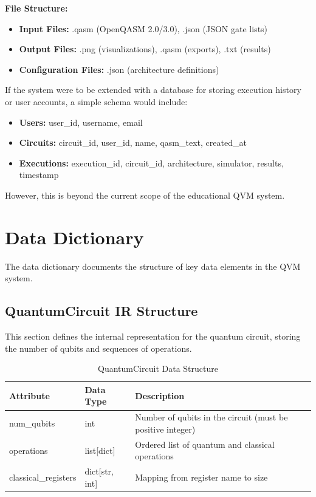 \textbf{File Structure:}
\begin{itemize}
\item \textbf{Input Files:} .qasm (OpenQASM 2.0/3.0), .json (JSON gate lists)
\item \textbf{Output Files:} .png (visualizations), .qasm (exports), .txt (results)
\item \textbf{Configuration Files:} .json (architecture definitions)
\end{itemize}

If the system were to be extended with a database for storing execution history or user accounts, a simple schema would include:
\begin{itemize}
\item \textbf{Users:} user\_id, username, email
\item \textbf{Circuits:} circuit\_id, user\_id, name, qasm\_text, created\_at
\item \textbf{Executions:} execution\_id, circuit\_id, architecture, simulator, results, timestamp
\end{itemize}

However, this is beyond the current scope of the educational QVM system.

\section{Data Dictionary}
The data dictionary documents the structure of key data elements in the QVM system.

\subsection{QuantumCircuit IR Structure}
This section defines the internal representation for the quantum circuit, storing the number of qubits and sequences of operations.

\begin{table}[H]
\centering
\caption{QuantumCircuit Data Structure}
\begin{tabular}{|p{3cm}|p{2.5cm}|p{7cm}|}
\hline
\textbf{Attribute} & \textbf{Data Type} & \textbf{Description} \\
\hline
num\_qubits & int & Number of qubits in the circuit (must be positive integer) \\
\hline
operations & list[dict] & Ordered list of quantum and classical operations \\
\hline
classical\_registers & dict[str, int] & Mapping from register name to size \\
\hline
\end{tabular}
\end{table}


